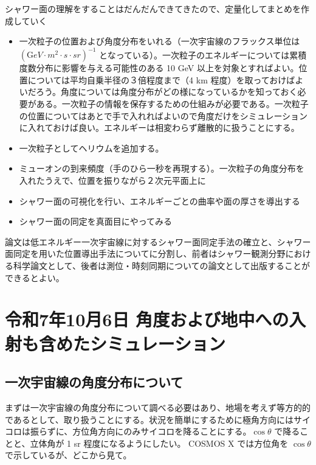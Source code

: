シャワー面の理解をすることはだんだんできてきたので、定量化してまとめを作成していく

\begin{itemize}
  \item 一次粒子の位置および角度分布をいれる（一次宇宙線のフラックス単位は $ ({\mathrm GeV}\cdot m^{2} \cdot s \cdot sr)^{-1} $ となっている）。一次粒子のエネルギーについては累積度数分布に影響を与える可能性のある 10 GeV 以上を対象とすればよい。位置については平均自乗半径の３倍程度まで（4 km 程度）を取っておけばよいだろう。角度については角度分布がどの様になっているかを知っておく必要がある。一次粒子の情報を保存するための仕組みが必要である。一次粒子の位置についてはあとで手で入れればよいので角度だけをシミュレーションに入れておけば良い。エネルギーは相変わらず離散的に扱うことにする。
  \item 一次粒子としてヘリウムを追加する。
  \item ミューオンの到来頻度（手のひら一秒を再現する）。一次粒子の角度分布を入れたうえで、位置を振りながら２次元平面上に
  \item シャワー面の可視化を行い、エネルギーごとの曲率や面の厚さを導出する
  \item シャワー面の同定を真面目にやってみる
\end{itemize}


論文は低エネルギー一次宇宙線に対するシャワー面同定手法の確立と、シャワー面同定を用いた位置導出手法についてに分割し、前者はシャワー観測分野における科学論文として、後者は測位・時刻同期についての論文として出版することができるとよい。


\section{令和7年10月6日 角度および地中への入射も含めたシミュレーション}
\label{sec:diary-20251006}

\subsection{一次宇宙線の角度分布について}

まずは一次宇宙線の角度分布について調べる必要はあり、地場を考えず等方的的であるとして、取り扱うことにする。状況を簡単にするために極角方向にはサイコロは振らずに、方位角方向にのみサイコロを降ることにする。$\cos \theta$ で降ることと、立体角が 1 sr 程度になるようにしたい。
COSMOS X では方位角を $\cos \theta$ で示しているが、どこから見て。

